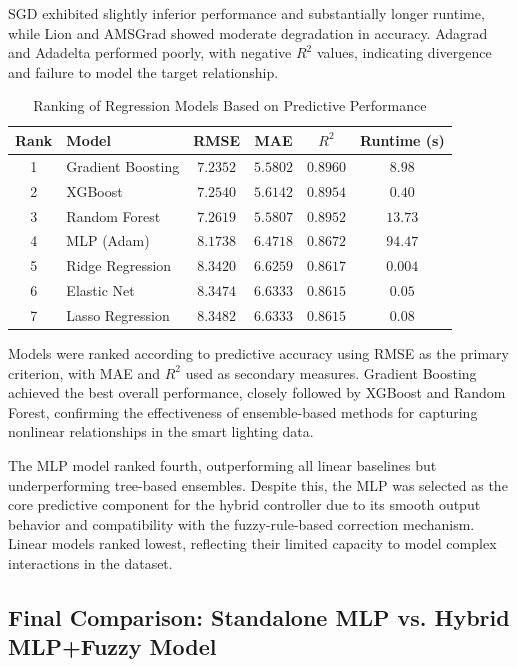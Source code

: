 \documentclass[conference]{IEEEtran}
\begin{document}
SGD exhibited slightly inferior performance and substantially longer runtime, while Lion and 
AMSGrad showed moderate degradation in accuracy. Adagrad and Adadelta performed poorly, 
with negative $R^2$ values, indicating divergence and failure to model the target relationship.

\begin{table}[H]
\centering
\caption{Ranking of Regression Models Based on Predictive Performance}
\label{tab:model_ranking}
\begin{tabular}{c|l|c|c|c|c}
\hline
\textbf{Rank} & \textbf{Model} & \textbf{RMSE} & \textbf{MAE} & \textbf{$R^2$} & \textbf{Runtime (s)} \\
\hline
1 & Gradient Boosting & \textbf{$7.2352$} & \textbf{$5.5802$} & \textbf{$0.8960$} & $8.98$ \\
2 & XGBoost & $7.2540$ & $5.6142$ & $0.8954$ & $0.40$\\
3 & Random Forest & $7.2619$ & $5.5807$ & $0.8952$ & $13.73$\\
4 & MLP (Adam) & $8.1738$ & $6.4718$ & $0.8672$ & $94.47$ \\
5 & Ridge Regression & $8.3420$ & $6.6259$ & $0.8617$ & $0.004$\\
6 & Elastic Net & $8.3474$ & $6.6333$ & $0.8615$ & $0.05$\\
7 & Lasso Regression & $8.3482$ & $6.6333$ & $0.8615$ & $0.08$\\
\hline
\end{tabular}
\end{table}

Models were ranked according to predictive accuracy using RMSE as the primary criterion, 
with MAE and $R^2$ used as secondary measures. Gradient Boosting achieved the best overall 
performance, closely followed by XGBoost and Random Forest, confirming the effectiveness 
of ensemble-based methods for capturing nonlinear relationships in the smart lighting data.

The MLP model ranked fourth, outperforming all linear baselines but underperforming 
tree-based ensembles. Despite this, the MLP was selected as the core predictive component 
for the hybrid controller due to its smooth output behavior and compatibility with the 
fuzzy-rule-based correction mechanism. Linear models ranked lowest, reflecting their 
limited capacity to model complex interactions in the dataset.

\subsection{Final Comparison: Standalone MLP vs. Hybrid MLP+Fuzzy Model}
\end{document}
